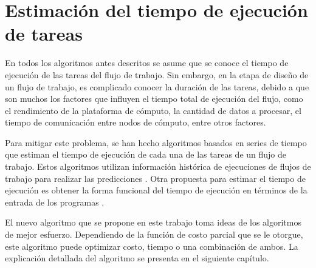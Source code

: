 	
\section{Estimación del tiempo de ejecuci\'on de tareas}

En todos los algoritmos antes descritos se asume que se conoce el tiempo de ejecución de las tareas del flujo de trabajo. Sin embargo, en la etapa de diseño de un flujo de trabajo, es complicado conocer la duración de las tareas, debido a que son muchos los factores que influyen el tiempo total de ejecución del flujo, como el rendimiento de la plataforma de cómputo, la cantidad de datos a procesar, el tiempo de comunicación entre nodos de cómputo, entre otros factores. 

Para mitigar este problema, se han hecho algoritmos basados en series de tiempo que estiman el tiempo de ejecución de cada una de las tareas de un flujo de trabajo. Estos algoritmos utilizan información histórica de ejecuciones de flujos de trabajo para realizar las predicciones  \cite{liu2011novel}. Otra propuesta para estimar el tiempo de ejecuci\'on es obtener la forma funcional del tiempo de ejecuci\'on en t\'erminos de la entrada de los programas \cite{coppa2012input}.

El nuevo algoritmo que se propone en este trabajo toma ideas de los algoritmos de mejor esfuerzo.  Dependiendo de la funci\'on de costo parcial que se le otorgue, este algoritmo puede optimizar costo, tiempo o una combinaci\'on de ambos. La explicaci\'on detallada del algoritmo se presenta en el siguiente cap\'itulo.
